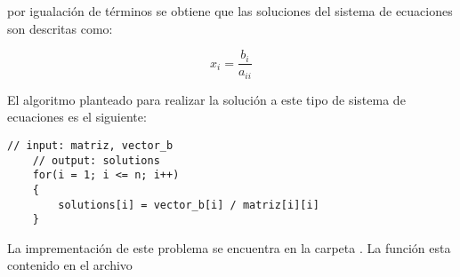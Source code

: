 por igualación de términos se obtiene que las soluciones del sistema de ecuaciones son descritas como:

\begin{equation*}
    x_i = \frac{b_i}{a_{ii}}
\end{equation*}

El algoritmo planteado para realizar la solución a este tipo de sistema de ecuaciones es el siguiente:

\begin{lstlisting}[style=CStyle]
    // input: matriz, vector_b
    // output: solutions
    for(i = 1; i <= n; i++)
    {
        solutions[i] = vector_b[i] / matriz[i][i]
    }
\end{lstlisting}

La imprementación de este problema se encuentra en la carpeta . La función  esta contenido en el archivo 